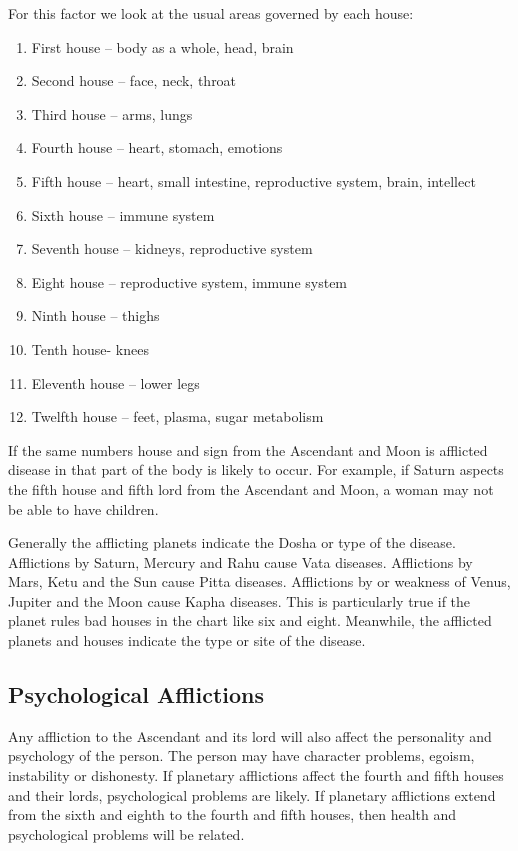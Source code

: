  

For this factor we look at the usual areas governed by each house:

 
\begin{enumerate}
\item First house – body as a whole, head, brain
\item Second house – face, neck, throat
\item Third house – arms, lungs
\item Fourth house – heart, stomach, emotions
\item Fifth house – heart, small intestine, reproductive system, brain, intellect
\item Sixth house – immune system
\item Seventh house – kidneys, reproductive system
\item Eight house – reproductive system, immune system
\item Ninth house – thighs
\item Tenth house- knees
\item Eleventh house – lower legs
\item Twelfth house – feet, plasma, sugar metabolism
\end{enumerate}

If the same numbers house and sign from the Ascendant and Moon is afflicted disease in that part of the body is likely to occur. For example, if Saturn aspects the fifth house and fifth lord from the Ascendant and Moon, a woman may not be able to have children.

 

Generally the afflicting planets indicate the Dosha or type of the disease. Afflictions by Saturn, Mercury and Rahu cause Vata diseases. Afflictions by Mars, Ketu and the Sun cause Pitta diseases. Afflictions by or weakness of Venus, Jupiter and the Moon cause Kapha diseases. This is particularly true if the planet rules bad houses in the chart like six and eight. Meanwhile, the afflicted planets and houses indicate the type or site of the disease.

 

\subsection{Psychological Afflictions}
 

Any affliction to the Ascendant and its lord will also affect the personality and psychology of the person. The person may have character problems, egoism, instability or dishonesty. If planetary afflictions affect the fourth and fifth houses and their lords, psychological problems are likely. If planetary afflictions extend from the sixth and eighth to the fourth and fifth houses, then health and psychological problems will be related.

